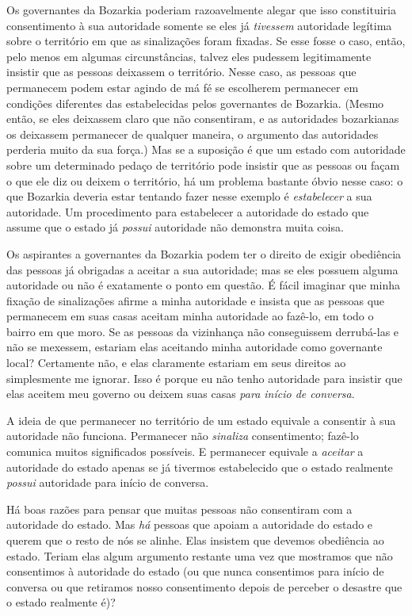Os governantes da Bozarkia poderiam razoavelmente alegar que isso constituiria consentimento à sua autoridade somente se eles já \emph{tivessem} autoridade legítima sobre o território em que as sinalizações foram fixadas. Se esse fosse o caso, então, pelo menos em algumas circunstâncias, talvez eles pudessem legitimamente insistir que as pessoas deixassem o território. Nesse caso, as pessoas que permanecem podem estar agindo de má fé se escolherem permanecer em condições diferentes das estabelecidas pelos governantes de Bozarkia. (Mesmo então, se eles deixassem claro que não consentiram, e as autoridades bozarkianas os deixassem permanecer de qualquer maneira, o argumento das autoridades perderia muito da sua força.) Mas se a suposição é que um estado com autoridade sobre um determinado pedaço de território pode insistir que as pessoas ou façam o que ele diz ou deixem o território, há um problema bastante óbvio nesse caso: o que Bozarkia deveria estar tentando fazer nesse exemplo é \emph{estabelecer} a sua autoridade. Um procedimento para estabelecer a autoridade do estado que assume que o estado já \emph{possui} autoridade não demonstra muita coisa.

Os aspirantes a governantes da Bozarkia podem ter o direito de exigir obediência das pessoas já obrigadas a aceitar a sua autoridade; mas se eles possuem alguma autoridade ou não é exatamente o ponto em questão. É fácil imaginar que minha fixação de sinalizações afirme a minha autoridade e insista que as pessoas que permanecem em suas casas aceitam minha autoridade ao fazê-lo, em todo o bairro em que moro. Se as pessoas da vizinhança não conseguissem derrubá-las e não se mexessem, estariam elas aceitando minha autoridade como governante local? Certamente não, e elas claramente estariam em seus direitos ao simplesmente me ignorar. Isso é porque eu não tenho autoridade para insistir que elas aceitem meu governo ou deixem suas casas \emph{para início de conversa}.

A ideia de que permanecer no território de um estado equivale a consentir à sua autoridade não funciona. Permanecer não \emph{sinaliza} consentimento; fazê-lo comunica muitos significados possíveis. E permanecer equivale a \emph{aceitar} a autoridade do estado apenas se já tivermos estabelecido que o estado realmente \emph{possui} autoridade para início de conversa.

Há boas razões para pensar que muitas pessoas não consentiram com a autoridade do estado. Mas \emph{há} pessoas que apoiam a autoridade do estado e querem que o resto de nós se alinhe. Elas insistem que devemos obediência ao estado. Teriam elas algum argumento restante uma vez que mostramos que não consentimos à autoridade do estado (ou que nunca consentimos para início de conversa ou que retiramos nosso consentimento depois de perceber o desastre que o estado realmente é)?

